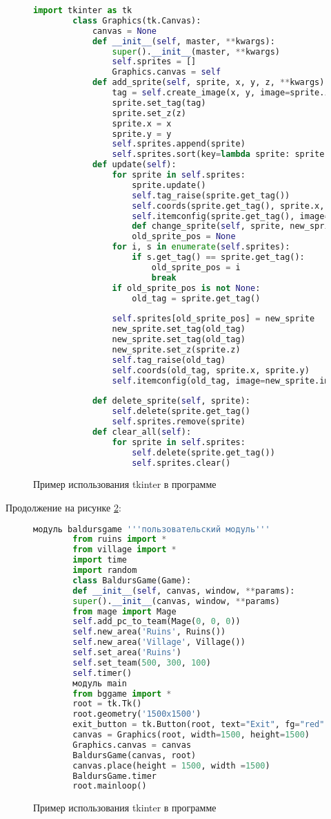 \begin{figure}[H]
	\begin{lstlisting}[language=Python]
		import tkinter as tk
		class Graphics(tk.Canvas):
			canvas = None
			def __init__(self, master, **kwargs):
				super().__init__(master, **kwargs)
				self.sprites = []
				Graphics.canvas = self			
			def add_sprite(self, sprite, x, y, z, **kwargs):
				tag = self.create_image(x, y, image=sprite.image, anchor='center', **kwargs)
				sprite.set_tag(tag)
				sprite.set_z(z)
				sprite.x = x
				sprite.y = y
				self.sprites.append(sprite)
				self.sprites.sort(key=lambda sprite: sprite.z)
			def update(self):
				for sprite in self.sprites:
					sprite.update()
					self.tag_raise(sprite.get_tag())
					self.coords(sprite.get_tag(), sprite.x, sprite.y)
					self.itemconfig(sprite.get_tag(), image=sprite.image)
					def change_sprite(self, sprite, new_sprite):
					old_sprite_pos = None
				for i, s in enumerate(self.sprites):
					if s.get_tag() == sprite.get_tag():
						old_sprite_pos = i
						break
				if old_sprite_pos is not None:
					old_tag = sprite.get_tag()
			
				self.sprites[old_sprite_pos] = new_sprite
				new_sprite.set_tag(old_tag)
				new_sprite.set_tag(old_tag)
				new_sprite.set_z(sprite.z)
				self.tag_raise(old_tag)
				self.coords(old_tag, sprite.x, sprite.y)
				self.itemconfig(old_tag, image=new_sprite.image)
			
			def delete_sprite(self, sprite):
				self.delete(sprite.get_tag()
				self.sprites.remove(sprite)
			def clear_all(self):	
				for sprite in self.sprites:
					self.delete(sprite.get_tag())
					self.sprites.clear()
	\end{lstlisting}  
	\caption{Пример использования tkinter в программе}
	\label{tkinter2:image}
\end{figure}


Продолжение на рисунке \ref{tkinter3:image}:
\begin{figure}[H]
	\begin{lstlisting}[language=Python]
		модуль baldursgame '''пользовательский модуль'''
		from ruins import *
		from village import *
		import time
		import random
		class BaldursGame(Game):
		def __init__(self, canvas, window, **params):
		super().__init__(canvas, window, **params)
		from mage import Mage
		self.add_pc_to_team(Mage(0, 0, 0))
		self.new_area('Ruins', Ruins())
		self.new_area('Village', Village())
		self.set_area('Ruins')
		self.set_team(500, 300, 100)
		self.timer()
		модуль main
		from bggame import *
		root = tk.Tk()
		root.geometry('1500x1500')
		exit_button = tk.Button(root, text="Exit", fg="red", command=root.destroy)
		canvas = Graphics(root, width=1500, height=1500)
		Graphics.canvas = canvas
		BaldursGame(canvas, root)
		canvas.place(height = 1500, width =1500)
		BaldursGame.timer
		root.mainloop()
	\end{lstlisting}  
	\caption{Пример использования tkinter в программе}
	\label{tkinter3:image}
\end{figure}
	
